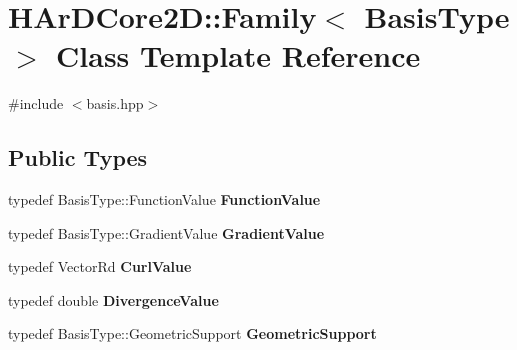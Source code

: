 \hypertarget{classHArDCore2D_1_1Family}{}\section{H\+Ar\+D\+Core2D\+:\+:Family$<$ Basis\+Type $>$ Class Template Reference}
\label{classHArDCore2D_1_1Family}


{\ttfamily \#include $<$basis.\+hpp$>$}

\subsection*{Public Types}
\begin{DoxyCompactItemize}
\item 
\mbox{\label{classHArDCore2D_1_1Family_a152a59e1b0aa753e65bb6553be665bdd}} 
typedef Basis\+Type\+::\+Function\+Value {\bfseries Function\+Value}
\item 
\mbox{\label{classHArDCore2D_1_1Family_a063c30fe4fcd2174052072b1e255e7b3}} 
typedef Basis\+Type\+::\+Gradient\+Value {\bfseries Gradient\+Value}
\item 
\mbox{\label{classHArDCore2D_1_1Family_abeb4fac2009a5491c66a9f426b372b32}} 
typedef Vector\+Rd {\bfseries Curl\+Value}
\item 
\mbox{\label{classHArDCore2D_1_1Family_a26b41c8bd34a7bbd4543f931c27d7115}} 
typedef double {\bfseries Divergence\+Value}
\item 
\mbox{\label{classHArDCore2D_1_1Family_a25780d2074b4184b02f14aed12cb7bd1}} 
typedef Basis\+Type\+::\+Geometric\+Support {\bfseries Geometric\+Support}
\end{DoxyCompactItemize}
